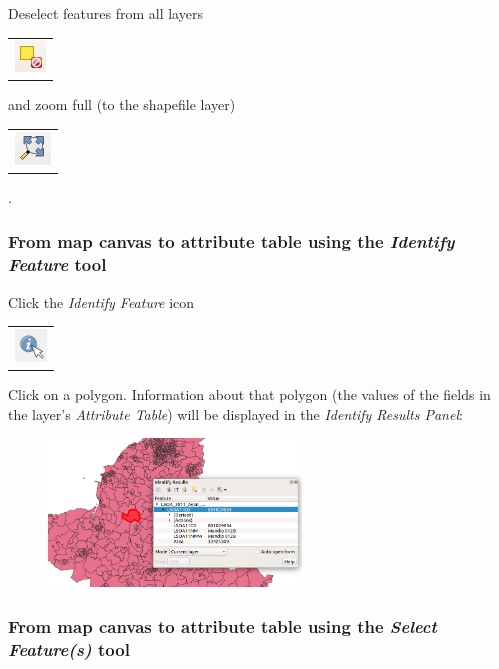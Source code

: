 Deselect features from all layers
	\begin{tabular}{@{}c@{}}\includegraphics[width=4ex]{images/deselect_features_icon.png}\end{tabular}
and zoom full (to the shapefile layer)     
	\begin{tabular}{@{}c@{}}\includegraphics[width=4ex]{images/full_zoom_icon.png}\end{tabular}
.

\subsubsection{From map canvas to attribute table using the \textit{Identify Feature} tool}

Click the \textit{Identify Feature} icon 
	\begin{tabular}{@{}c@{}}\includegraphics[width=4ex]{images/identify_feature_icon.png}\end{tabular}

Click on a polygon. Information about that polygon (the values of the fields in the layer's \textit{Attribute Table}) will be displayed in the \textit{Identify Results Panel}:  

\begin{figure}[!h]
	\centering
	\includegraphics[width=0.6\textwidth]{images/identify_feature_window.png}
	\caption{}
	\label{ft_fig_firstfig3}
\end{figure}

\subsubsection{From map canvas to attribute table using the \textit{Select Feature(s)} tool}

